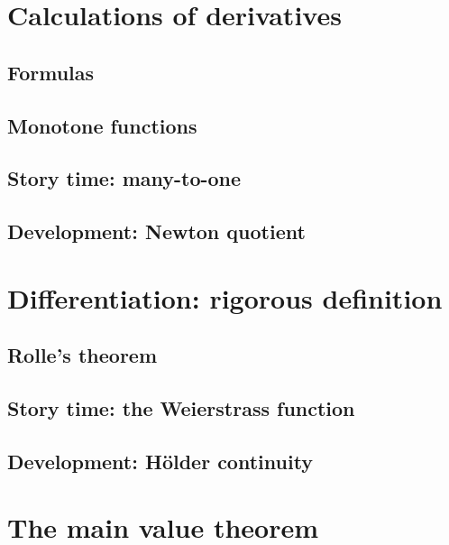 \documentclass[
	fontsize=10pt, %
	twoside=true, %
	secnumdepth=1, %
	numbers=noenddot, %
]{kaobook}
\begin{document}

\chapter{Calculations of derivatives}

\section{Formulas}

\section{Monotone functions}

\section{Story time: many-to-one}

\section{Development: Newton quotient}

\chapter{Differentiation: rigorous definition}

\blindtext

\section{Rolle's theorem}

\section{Story time: the Weierstrass function}

\section{Development: Hölder continuity}

\chapter{The main value theorem}
\end{document}
